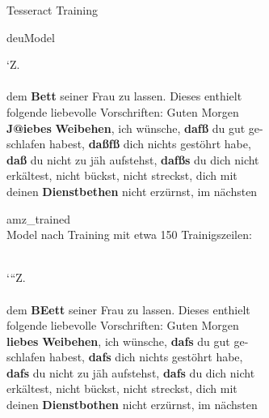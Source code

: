 \documentclass[aspectratio=169]{beamer}
\begin{document}
\begin{frame}{Tesseract Training}
	\fontsize{9pt}{10pt}\selectfont
	\begin{block}{\glqq deu\grqq Model}
			\begin{minipage}[t]{0.9\textwidth}
			‘Z.  \\                                             
			~\\   
			dem\textbf{ Bett }seiner Frau zu lassen. Dieses enthielt   \\
			folgende liebevolle Vorschriften: Guten Morgen    \\
			\textbf{J@iebes} \textbf{Weibehen}, ich wünsche, \textbf{dafß }du gut ge-    \\
			schlafen habest,\textbf{ daßfß} dich nichts gestöhrt habe, \\
			\textbf{daß} du nicht zu jäh aufstehst, \textbf{dafßs }du dich nicht\\
			erkältest, nicht bückst, nicht streckst, dich mit \\
			deinen\textbf{ Dienstbethen} nicht erzürnst, im nächsten   
		\end{minipage}
	\end{block}

	\begin{block}{\glqq amz\_trained\grqq\\Model  }
		nach Training mit etwa 150 Trainigszeilen:\\
		~\\
	\begin{minipage}[t]{0.9\textwidth}
		‘“Z.       \\                                       
		~\\ 
		dem \textbf{BEett} seiner Frau zu lassen. Dieses enthielt  \\
		folgende liebevolle Vorschriften: Guten Morgen    \\
		\textbf{liebes}\textbf{ Weibehen}, ich wünsche, \textbf{dafs} du gut ge-     \\
		schlafen habest,\textbf{ dafs} dich nichts gestöhrt habe,  \\
		\textbf{dafs} du nicht zu jäh aufstehst, \textbf{dafs} du dich nicht\\
		erkältest, nicht bückst, nicht streckst, dich mit \\
		deinen \textbf{Dienstbothen} nicht erzürnst, im nächsten 
	\end{minipage}
	\end{block}
\end{frame}
\end{document}
